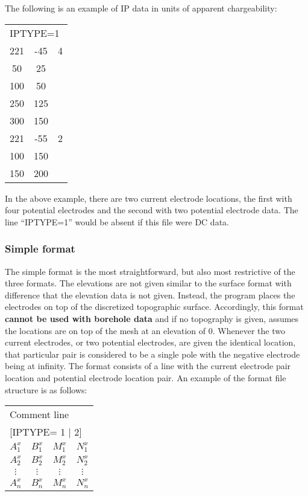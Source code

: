 The following is an example of IP data in units of apparent chargeability:

\begin{fileExample}
\begin{tabular}{|ccc|}
\hline
\multicolumn{3}{|l|}{IPTYPE=1} \\
221 & -45  &  4 \\
50 &   25  &  \\
100 &   50 &  \\
250 &  125 &  \\
300 &  150  &  \\
221 &  -55 &  2 \\
100 &  150 &  \\
150 &  200 & \\
\hline
\end{tabular}
\end{fileExample}
%
In the above example, there are two current electrode locations, the first with four potential electrodes and the second with two potential electrode data. The line ``IPTYPE=1'' would be absent if this file were DC data. 

\subsubsection*{Simple format}
The simple format is the most straightforward, but also most restrictive of the three formats. The elevations are not given similar to the surface format with difference that the elevation data is not given. Instead, the program places the electrodes on top of the discretized topographic surface. Accordingly, this format \textbf{cannot be used with borehole data} and if no topography is given, assumes the locations are on top of the mesh at an elevation of 0. Whenever the two current electrodes, or two potential electrodes, are given the identical location, that particular pair is considered to be a single pole with the negative electrode being at infinity. The format consists of a line with the current electrode pair location and potential electrode location pair. An example of the  format file structure is as follows:

\begin{fileExample}
\begin{tabular}{|cccc|}
\hline
\multicolumn{4}{|l|}{Comment line} \\
\multicolumn{4}{|l|}{[IPTYPE= 1 | 2]} \\
$A_1^x$ & $B_1^x$ &  $M_1^x$ & $N_1^x$  \\
$A_2^x$ & $B_2^x$ &  $M_2^x$ & $N_2^x$\\
$\vdots$ & $\vdots$ & $\vdots$ & $\vdots$ \\
$A_n^x$ & $B_n^x$ &  $M_n^x$ & $N_n^x$ \\
\hline
\end{tabular}
\end{fileExample}

